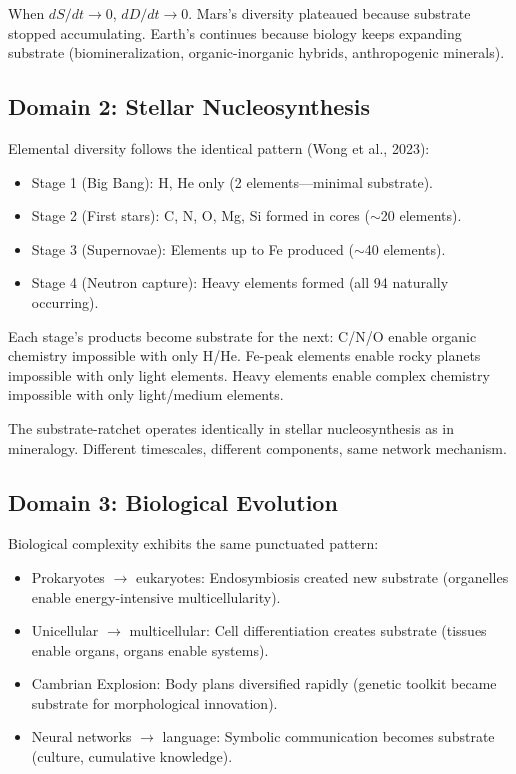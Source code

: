 \documentclass[12pt,a4paper]{article}
\begin{document}
When $dS/dt \rightarrow 0$, $dD/dt \rightarrow 0$. Mars's diversity plateaued because substrate stopped accumulating. Earth's continues because biology keeps expanding substrate (biomineralization, organic-inorganic hybrids, anthropogenic minerals).

\subsection{Domain 2: Stellar Nucleosynthesis}

Elemental diversity follows the identical pattern (Wong et al., 2023):

\begin{itemize}
    \item Stage 1 (Big Bang): H, He only (2 elements---minimal substrate).
    \item Stage 2 (First stars): C, N, O, Mg, Si formed in cores ($\sim$20 elements).
    \item Stage 3 (Supernovae): Elements up to Fe produced ($\sim$40 elements).
    \item Stage 4 (Neutron capture): Heavy elements formed (all 94 naturally occurring).
\end{itemize}

Each stage's products become substrate for the next: C/N/O enable organic chemistry impossible with only H/He. Fe-peak elements enable rocky planets impossible with only light elements. Heavy elements enable complex chemistry impossible with only light/medium elements.

The substrate-ratchet operates identically in stellar nucleosynthesis as in mineralogy. Different timescales, different components, same network mechanism.

\subsection{Domain 3: Biological Evolution}

Biological complexity exhibits the same punctuated pattern:
\begin{itemize}
    \item Prokaryotes $\rightarrow$ eukaryotes: Endosymbiosis created new substrate (organelles enable energy-intensive multicellularity).
    \item Unicellular $\rightarrow$ multicellular: Cell differentiation creates substrate (tissues enable organs, organs enable systems).
    \item Cambrian Explosion: Body plans diversified rapidly (genetic toolkit became substrate for morphological innovation).
    \item Neural networks $\rightarrow$ language: Symbolic communication becomes substrate (culture, cumulative knowledge).
\end{itemize}
\end{document}
